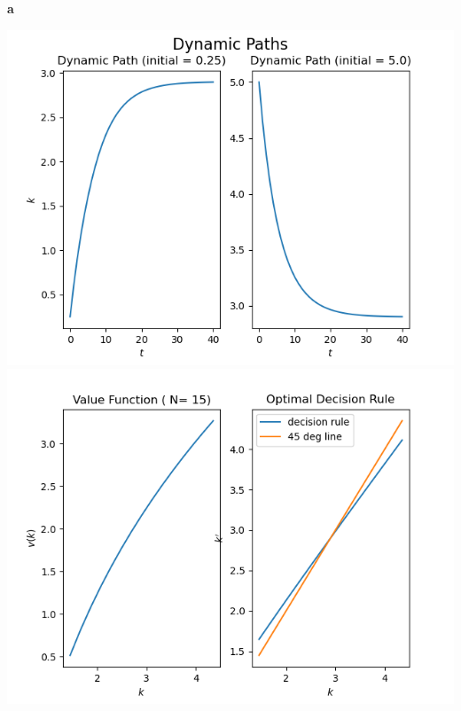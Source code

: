 \documentclass[12pt]{article}
\begin{document}
\begin{enumerate}
	\begin{center}
		\textbf{a}\par\medskip
		\includegraphics[width=0.8\linewidth]{Q3DynamicPaths.png}
		\includegraphics[width=0.8\linewidth]{fig1.png}
	\end{center}
\end{enumerate} 
\end{document}
